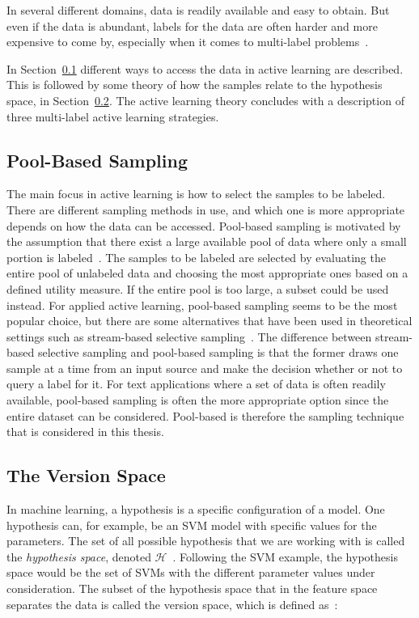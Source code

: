 In several different domains, data is readily available and easy to obtain.
But even if the data is abundant, labels for the data are often harder and more expensive to come by, especially when it comes to multi-label problems~\cite{settles2012active}.

In Section~\ref{sec:pool-based-sampling} different ways to access the data in active learning are described.
This is followed by some theory of how the samples relate to the hypothesis space, in Section~\ref{sec:the-version-space}.
The active learning theory concludes with a description of three multi-label active learning strategies.

\subsection{Pool-Based Sampling}
\label{sec:pool-based-sampling}

The main focus in active learning is how to select the samples to be labeled.
There are different sampling methods in use, and which one is more appropriate depends on how the data can be accessed.
Pool-based sampling is motivated by the assumption that there exist a large available pool of data where only a small portion is labeled~\cite{lewis1994sequential, settles2012active}.
The samples to be labeled are selected by evaluating the entire pool of unlabeled data and choosing the most appropriate ones based on a defined utility measure.
If the entire pool is too large, a subset could be used instead.
For applied active learning, pool-based sampling seems to be the most popular choice, but there are some alternatives that have been used in theoretical settings such as stream-based selective sampling~\cite{li2013active}.
The difference between stream-based selective sampling and pool-based sampling is that the former draws one sample at a time from an input source and make the decision whether or not to query a label for it.
For text applications where a set of data is often readily available, pool-based sampling is often the more appropriate option since the entire dataset can be considered.
Pool-based is therefore the sampling technique that is considered in this thesis.

\subsection{The Version Space}
\label{sec:the-version-space}

In machine learning, a hypothesis is a specific configuration of a model.
One hypothesis can, for example, be an SVM model with specific values for the parameters.
The set of all possible hypothesis that we are working with is called the \textit{hypothesis space}, denoted $\mathcal{H}$~\cite{russell2016artificial}.
Following the SVM example, the hypothesis space would be the set of SVMs with the different parameter values under consideration.
The subset of the hypothesis space that in the feature space separates the data is called the version space, which is defined as~\cite{settles2012active,tong2001support}:

